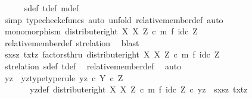 \begin{isabellebody}
\ \ \ \ \isamarkupfalse%
\ s{\isacharunderscore}{\kern0pt}def\ t{\isacharunderscore}{\kern0pt}def\ m{\isacharunderscore}{\kern0pt}def\isanewline
\ \ \isamarkupfalse%
\ {\isacharparenleft}{\kern0pt}simp{\isacharcomma}{\kern0pt}\ typecheck{\isacharunderscore}{\kern0pt}cfuncs{\isacharcomma}{\kern0pt}\ auto{\isacharcomma}{\kern0pt}\ unfold\ relative{\isacharunderscore}{\kern0pt}member{\isacharunderscore}{\kern0pt}def{}{\isacharcomma}{\kern0pt}\ auto{\isacharparenright}{\kern0pt}\isanewline
\ \ \ \ \isamarkupfalse%
\ {\isachardoublequoteopen}monomorphism\ {\isacharparenleft}{\kern0pt}distribute{\isacharunderscore}{\kern0pt}right\ X\ X\ Z\ {\isasymcirc}\isactrlsub c\ m\ {\isasymtimes}\isactrlsub f\ id\isactrlsub c\ Z{\isacharparenright}{\kern0pt}{\isachardoublequoteclose}\isanewline
\ \ \ \ \ \ \isamarkupfalse%
\ relative{\isacharunderscore}{\kern0pt}member{\isacharunderscore}{\kern0pt}def{}\ st{\isacharunderscore}{\kern0pt}relation\ \isamarkupfalse%
\ blast\isanewline
\isanewline
\ \ \ \ \isamarkupfalse%
\ {\isachardoublequoteopen}{\isasymlangle}{\isasymlangle}sx{\isacharcomma}{\kern0pt}sz{\isasymrangle}{\isacharcomma}{\kern0pt}\ {\isasymlangle}tx{\isacharcomma}{\kern0pt}tz{\isasymrangle}{\isasymrangle}\ factorsthru\ {\isacharparenleft}{\kern0pt}distribute{\isacharunderscore}{\kern0pt}right\ X\ X\ Z\ {\isasymcirc}\isactrlsub c\ m\ {\isasymtimes}\isactrlsub f\ id\isactrlsub c\ Z{\isacharparenright}{\kern0pt}{\isachardoublequoteclose}\isanewline
\ \ \ \ \ \ \isamarkupfalse%
\ st{\isacharunderscore}{\kern0pt}relation\ s{\isacharunderscore}{\kern0pt}def\ t{\isacharunderscore}{\kern0pt}def\ \isamarkupfalse%
\ relative{\isacharunderscore}{\kern0pt}member{\isacharunderscore}{\kern0pt}def{}\ \isamarkupfalse%
\ auto\isanewline
\ \ \ \ \isamarkupfalse%
\ \isamarkupfalse%
\ yz\ \ yz{\isacharunderscore}{\kern0pt}type{\isacharbrackleft}{\kern0pt}type{\isacharunderscore}{\kern0pt}rule{\isacharbrackright}{\kern0pt}{\isacharcolon}{\kern0pt}\ {\isachardoublequoteopen}yz\ {\isasymin}\isactrlsub c\ Y\ {\isasymtimes}\isactrlsub c\ Z{\isachardoublequoteclose}\isanewline
\ \ \ \ \ \ \ yz{\isacharunderscore}{\kern0pt}def{\isacharcolon}{\kern0pt}\ {\isachardoublequoteopen}{\isacharparenleft}{\kern0pt}distribute{\isacharunderscore}{\kern0pt}right\ X\ X\ Z\ {\isasymcirc}\isactrlsub c\ {\isacharparenleft}{\kern0pt}m\ {\isasymtimes}\isactrlsub f\ id\isactrlsub c\ Z{\isacharparenright}{\kern0pt}{\isacharparenright}{\kern0pt}\ {\isasymcirc}\isactrlsub c\ yz\ {\isacharequal}{\kern0pt}\ {\isasymlangle}{\isasymlangle}sx{\isacharcomma}{\kern0pt}sz{\isasymrangle}{\isacharcomma}{\kern0pt}\ {\isasymlangle}tx{\isacharcomma}{\kern0pt}tz{\isasymrangle}{\isasymrangle}{\isachardoublequoteclose}\isanewline

\end{isabellebody}
